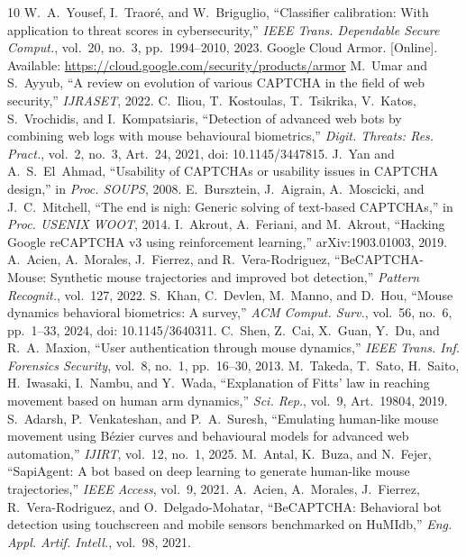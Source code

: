\documentclass{ieeetj}
\begin{document}
\begin{thebibliography}{10}
 W.~A.~Yousef, I.~Traor\'e, and W.~Briguglio, ``Classifier calibration: With application to threat scores in cybersecurity,'' \emph{IEEE Trans. Dependable Secure Comput.}, vol.~20, no.~3, pp.~1994--2010, 2023.
 Google Cloud Armor. [Online]. Available: \url{https://cloud.google.com/security/products/armor}
 M.~Umar and S.~Ayyub, ``A review on evolution of various CAPTCHA in the field of web security,'' \emph{IJRASET}, 2022.
 C.~Iliou, T.~Kostoulas, T.~Tsikrika, V.~Katos, S.~Vrochidis, and I.~Kompatsiaris, ``Detection of advanced web bots by combining web logs with mouse behavioural biometrics,'' \emph{Digit. Threats: Res. Pract.}, vol.~2, no.~3, Art.~24, 2021, doi: 10.1145/3447815.
 J.~Yan and A.~S.~El~Ahmad, ``Usability of CAPTCHAs or usability issues in CAPTCHA design,'' in \emph{Proc. SOUPS}, 2008.
 E.~Bursztein, J.~Aigrain, A.~Moscicki, and J.~C.~Mitchell, ``The end is nigh: Generic solving of text-based CAPTCHAs,'' in \emph{Proc. USENIX WOOT}, 2014.
 I.~Akrout, A.~Feriani, and M.~Akrout, ``Hacking Google reCAPTCHA v3 using reinforcement learning,'' arXiv:1903.01003, 2019.
 A.~Acien, A.~Morales, J.~Fierrez, and R.~Vera-Rodriguez, ``BeCAPTCHA-Mouse: Synthetic mouse trajectories and improved bot detection,'' \emph{Pattern Recognit.}, vol.~127, 2022.
 S.~Khan, C.~Devlen, M.~Manno, and D.~Hou, ``Mouse dynamics behavioral biometrics: A survey,'' \emph{ACM Comput. Surv.}, vol.~56, no.~6, pp.~1--33, 2024, doi: 10.1145/3640311.
 C.~Shen, Z.~Cai, X.~Guan, Y.~Du, and R.~A.~Maxion, ``User authentication through mouse dynamics,'' \emph{IEEE Trans. Inf. Forensics Security}, vol.~8, no.~1, pp.~16--30, 2013.
 M.~Takeda, T.~Sato, H.~Saito, H.~Iwasaki, I.~Nambu, and Y.~Wada, ``Explanation of Fitts' law in reaching movement based on human arm dynamics,'' \emph{Sci. Rep.}, vol.~9, Art.~19804, 2019.
 S.~Adarsh, P.~Venkateshan, and P.~A.~Suresh, ``Emulating human-like mouse movement using B\'ezier curves and behavioural models for advanced web automation,'' \emph{IJIRT}, vol.~12, no.~1, 2025.
 M.~Antal, K.~Buza, and N.~Fejer, ``SapiAgent: A bot based on deep learning to generate human-like mouse trajectories,'' \emph{IEEE Access}, vol.~9, 2021.
 A.~Acien, A.~Morales, J.~Fierrez, R.~Vera-Rodriguez, and O.~Delgado-Mohatar, ``BeCAPTCHA: Behavioral bot detection using touchscreen and mobile sensors benchmarked on HuMIdb,'' \emph{Eng. Appl. Artif. Intell.}, vol.~98, 2021.

\end{thebibliography}
\end{document}
